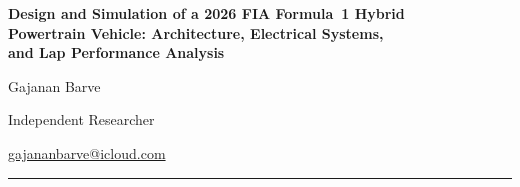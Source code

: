 \documentclass[12pt, a4paper]{article}
\begin{document}
\begin{center}
  {\LARGE\bfseries Design and Simulation of a 2026 FIA Formula~1 Hybrid\\[4pt]
   Powertrain Vehicle: Architecture, Electrical Systems,\\[4pt]
   and Lap Performance Analysis\par}
  \vspace{1.2em}
  {\large Gajanan Barve\par}
  \vspace{0.4em}
  {\normalsize Independent Researcher\par}
  \vspace{0.3em}
  {\normalsize \href{mailto:gajananbarve@icloud.com}{gajananbarve@icloud.com}\par}
\end{center}

\vspace{0.6em}
\noindent\rule{\textwidth}{0.4pt}
\end{document}
